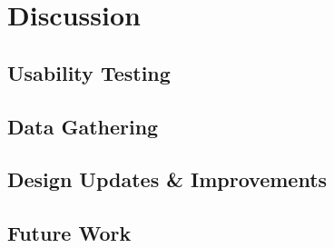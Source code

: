 \chapter{Discussion}

\section{Usability Testing}
\section{Data Gathering}
\section{Design Updates \& Improvements}
\section{Future Work}


